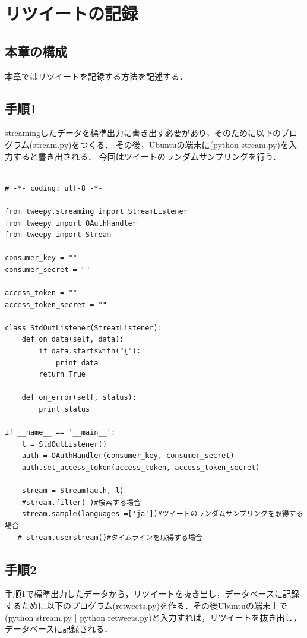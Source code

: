 \section{リツイートの記録}

\subsection{本章の構成}
本章ではリツイートを記録する方法を記述する．

\subsection{手順1}
streamingしたデータを標準出力に書き出す必要があり，そのために以下のプログラム(stream.py)をつくる．
その後，Ubuntuの端末に(python stream.py)を入力すると書き出される．
今回はツイートのランダムサンプリングを行う．
\begin{verbatim}

# -*- coding: utf-8 -*-

from tweepy.streaming import StreamListener
from tweepy import OAuthHandler
from tweepy import Stream

consumer_key = ""
consumer_secret = ""

access_token = ""
access_token_secret = ""

class StdOutListener(StreamListener):
    def on_data(self, data):
        if data.startswith("{"):
            print data
        return True
 
    def on_error(self, status):
        print status
 
if __name__ == '__main__':
    l = StdOutListener()
    auth = OAuthHandler(consumer_key, consumer_secret)
    auth.set_access_token(access_token, access_token_secret)
 
    stream = Stream(auth, l)
    #stream.filter( )#検索する場合
    stream.sample(languages =['ja'])#ツイートのランダムサンプリングを取得する場合
   # stream.userstream()#タイムラインを取得する場合

\end{verbatim}

\subsection{手順2}
手順1で標準出力したデータから，リツイートを抜き出し，データベースに記録するために以下のプログラム(retweets.py)を作る．その後Ubuntuの端末上で(python stream.py | python retweets.py)と入力すれば，リツイートを抜き出し，データベースに記録される．

